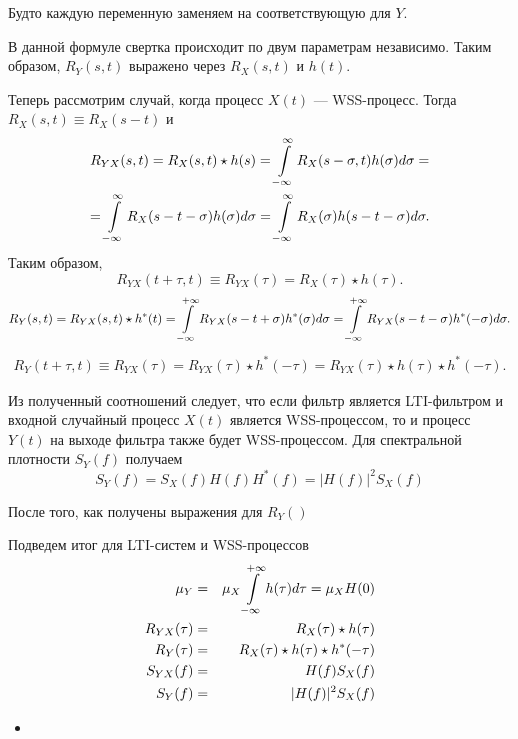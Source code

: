\documentclass{book}
\numberwithin{theorem}{chapter}
\numberwithin{statement}{chapter}
\numberwithin{lemma}{chapter}
\theoremstyle{definition}
\numberwithin{task}{chapter}
\theoremstyle{remark}
\numberwithin{example}{chapter}
\theoremstyle{definition}
\numberwithin{definition}{chapter}
\theoremstyle{remark}
\theoremstyle{remark}
\numberwithin{lyrics}{section}
\begin{document}
Будто каждую переменную заменяем на соответствующую для $Y$.

В данной формуле свертка происходит по двум параметрам независимо. Таким образом, $R_{Y}(s, t)$ выражено через $R_X(s, t)$ и $h(t)$.

Теперь рассмотрим случай, когда процесс $X(t)$ --- WSS-процесс. Тогда $R_X(s,t)\equiv R_X(s - t)$ и 
\begin{gather*}
R_{YX}(s, t) = R_{X}(s, t) \star h(s) = \int\limits_{-\infty}^{\infty} R_{X}(s - \sigma, t) h(\sigma) d\sigma = \\ = 
\int\limits_{-\infty}^{\infty} R_{X}(s - t - \sigma) h(\sigma) d\sigma = \int\limits_{-\infty}^{\infty} R_{X}(\sigma) h(s - t - \sigma) d\sigma.
\end{gather*}
Таким образом,
$$
R_{YX}(t + \tau, t) \equiv R_{YX}(\tau) = R_X(\tau) \star h(\tau).
$$
\begin{gather*}
R_Y(s, t) = R_{YX}(s, t) \star h^*(t) = \int\limits_{-\infty}^{+\infty} R_{YX}(s - t + \sigma) h^*(\sigma) d \sigma =  \int\limits_{-\infty}^{+\infty} R_{YX}(s - t - \sigma) h^*(-\sigma) d \sigma.
\end{gather*}
\begin{gather*}
R_Y(t+\tau, t) \equiv R_{YX}(\tau) = R_{YX}(\tau) \star h^*(-\tau) =  R_{YX}(\tau) \star h(\tau)  \star h^*(-\tau).
\end{gather*}

Из полученный соотношений следует, что если фильтр является LTI-фильтром и входной случайный процесс $X(t)$ является WSS-процессом, то и процесс $Y(t)$ на выходе фильтра также будет WSS-процессом. Для спектральной плотности $S_Y(f)$ получаем
\begin{equation}
S_Y(f) = S_X(f) H(f) H^*(f) = |H(f)|^2 S_X(f)
\end{equation}

После того, как получены выражения для $R_{Y}()$

Подведем итог для LTI-систем и WSS-процессов
\begin{eqnarray}
\mu_Y &=& \mu_X \int\limits_{-\infty}^{+\infty} h(\tau) d\tau = \mu_X H(0) \\
R_{YX}(\tau)  &=& R_{X}(\tau) \star h(\tau) \\
R_{Y}(\tau)   &=& R_{X}(\tau) \star h(\tau) \star h^*(-\tau) \\
S_{YX}(f)     &=& H(f) S_X(f)\\
S_{Y}(f)      &=& |H(f)|^2 S_X(f) \\
\end{eqnarray}

\begin{itemize}
	\item 
\end{itemize}
\end{document}
